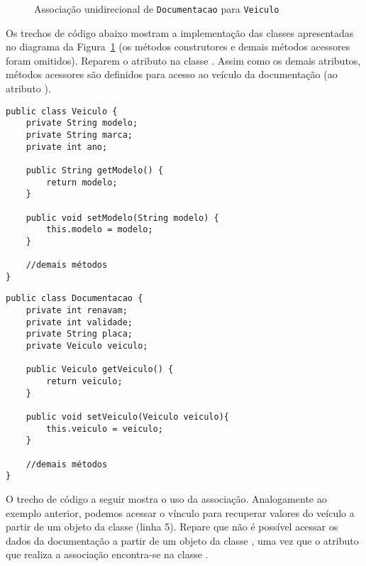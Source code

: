 \begin{figure}[h]
	\centering
	
	
	\caption{Associação unidirecional de \texttt{Documentacao} para \texttt{Veiculo}}
	\label{fig:associacao-uni-documentacao}
\end{figure}

Os trechos de código abaixo mostram a implementação das classes apresentadas no diagrama da Figura~\ref{fig:associacao-uni-documentacao} (os métodos construtores e demais métodos acessores foram omitidos). Reparem o atributo  na classe . Assim como os demais atributos, métodos acessores são definidos para acesso ao veículo da documentação (ao atributo ).

\begin{verbatim}
public class Veiculo {
	private String modelo;
	private String marca;
	private int ano;
	
	public String getModelo() {
		return modelo;
	}
	
	public void setModelo(String modelo) {
		this.modelo = modelo;
	}
	
	//demais métodos
}
\end{verbatim}

\begin{verbatim}
public class Documentacao {
	private int renavam;
	private int validade;
	private String placa;
	private Veiculo veiculo;
	
	public Veiculo getVeiculo() {
		return veiculo;
	}
	
	public void setVeiculo(Veiculo veiculo){
		this.veiculo = veiculo;
	}
	
	//demais métodos
}
\end{verbatim}

O trecho de código a seguir mostra o uso da associação. Analogamente ao exemplo anterior, podemos acessar o vínculo para recuperar valores do veículo a partir de um objeto da classe  (linha 5). Repare que não é possível acessar os dados da documentação a partir de um objeto da classe , uma vez que o atributo que realiza a associação encontra-se na classe .

